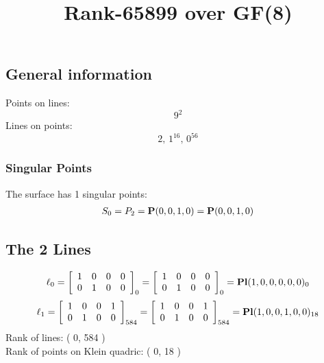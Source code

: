 \documentclass{article}
\newcommand\setTBstruts{\def\T{\rule{0pt}{2.6ex}}%
\def\B{\rule[-1.2ex]{0pt}{0pt}}}
\newcommand{\bP}{{\bf P}}
\begin{document}
 
\setTBstruts



{\allowdisplaybreaks%






\title{Rank-65899 over GF(8)}
\author{}%
\maketitle%
%
{}



\subsection*{General information}
Points on lines:
$$
9^2$$
Lines on points:
$$
2,\,1^{16},\,0^{56}$$
\subsubsection*{Singular Points}
The surface has 1 singular points:\\
\begin{align*}
S_{0} &= P_{2}=\bP(0, 0, 1, 0) = \bP(0, 0, 1, 0)\\
\end{align*}
\subsection*{The 2 Lines}
$$
\ell_{0} = 
\left[
\begin{array}{*{4}{r}}
1 & 0 & 0 & 0\\
0 & 1 & 0 & 0\\
\end{array}
\right]
_{0}
=
\left[
\begin{array}{*{4}c}
1  & 0  & 0  & 0\\
0  & 1  & 0  & 0\\
\end{array}
\right]_{0}
={\rm\bf Pl}(1,0,0,0,0,0 )_{0}$$
$$
\ell_{1} = 
\left[
\begin{array}{*{4}{r}}
1 & 0 & 0 & 1\\
0 & 1 & 0 & 0\\
\end{array}
\right]
_{584}
=
\left[
\begin{array}{*{4}c}
1  & 0  & 0  & 1\\
0  & 1  & 0  & 0\\
\end{array}
\right]_{584}
={\rm\bf Pl}(1,0,0,1,0,0 )_{18}$$
Rank of lines: ( 0, 584 )\\
Rank of points on Klein quadric: ( 0, 18 )\\
}
\end{document}

